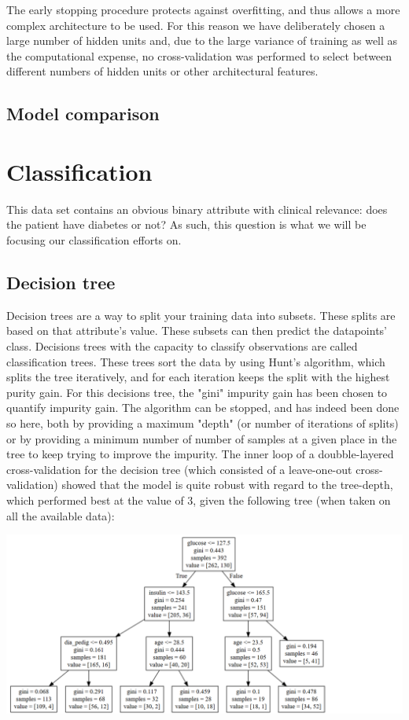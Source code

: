 The early stopping procedure protects against overfitting,
and thus allows a more complex architecture to be used.
For this reason we have deliberately chosen a large number of hidden units
and, due to the large variance of training as well as the computational expense,
no cross-validation was performed to select between different numbers of hidden units
or other architectural features.

\subsection{Model comparison}


\section{Classification}

This data set contains an obvious binary attribute
with clinical relevance:
does the patient have diabetes or not?
As such, this question is what we will be
focusing our classification efforts on.

\subsection{Decision tree}
Decision trees are a way to split your training data into subsets. These splits are based on that attribute's value.
These subsets can then predict the datapoints' class. Decisions trees with the capacity to classify observations are called
classification trees. These trees sort the data by using Hunt's algorithm, which
splits the tree iteratively, and for each iteration keeps the split with the
highest purity gain. For this decisions tree, the "gini" impurity gain has been
chosen to quantify impurity gain. The algorithm can be stopped, and has indeed
been done so here, both by providing a maximum "depth" (or number of iterations
of splits) or by providing a minimum number of number of samples at a given
place in the tree to keep trying to improve the impurity.
The inner loop of a doubble-layered cross-validation for the decision tree
(which consisted of a leave-one-out cross-validation) showed
that the model is quite robust with regard to the tree-depth, which performed
best at the value of 3, given the following tree (when taken on all the available
data):

\includegraphics[width=\textwidth]{tree.png}

